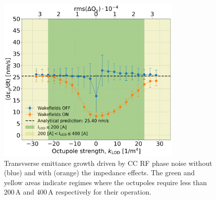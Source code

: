 \begin{figure}[!h] %
   \centering         
   \includegraphics[width=0.8\textwidth]{images/Ch8/deyRates_sps_270GeV_PN1e-8_400MHz_SPS_CC2_updatedWakes_y-plane_WakesOFF_vs_WakesON_new_QpxQpy0.5_6D_Nb5e5_intensity3e10Scan_vs_TuneSpreadvsExpectedSPS_octupole_current.png}
       \caption{Transvserse emittance growth driven by CC RF phase noise without (blue) and with (orange) the impedance effects. The green and yellow areas indicate regimes where the octupoles require less than 200\,A and 400\,A respectively for their operation.}
       \label{fig:pyheadtail_cc_impedance_2022_md_octupole_current}
\end{figure}

